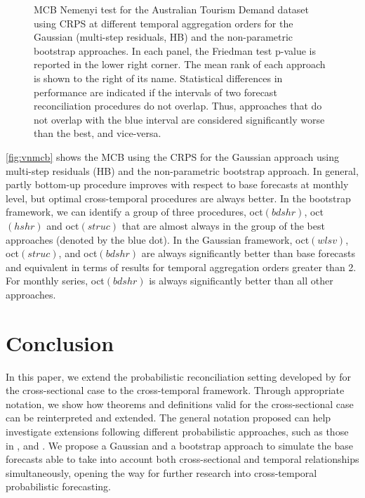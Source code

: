 \documentclass[12pt]{article}
\theoremstyle{definition}
\begin{document}
\begin{figure}[p]
	\caption{MCB Nemenyi test for the Australian Tourism Demand dataset using CRPS at different temporal aggregation orders for the Gaussian (multi-step residuals, HB) and the non-parametric bootstrap approaches. In each panel, the Friedman test p-value is reported in the lower right corner. The mean rank of each approach is shown to the right of its name. Statistical differences in performance are indicated if the intervals of two forecast reconciliation procedures do not overlap. Thus, approaches that do not overlap with the blue interval are considered significantly worse than the best, and vice-versa.}
	\label{fig:vnmcb}
\end{figure}

\autoref{fig:vnmcb} shows the MCB using the CRPS for the Gaussian approach using multi-step residuals (HB) and the non-parametric bootstrap approach. In general, partly bottom-up procedure improves with respect to base forecasts at monthly level, but optimal cross-temporal procedures are always better. In the bootstrap framework, we can identify a group of three procedures, oct$(bdshr)$, oct$(hshr)$ and oct$(struc)$ that are almost always in the group of the best approaches (denoted by the blue dot). In the Gaussian framework, oct$(wlsv)$, oct$(struc)$, and oct$(bdshr)$ are always significantly better than base forecasts and equivalent in terms of results for temporal aggregation orders greater than 2. For monthly series, oct$(bdshr)$ is always significantly better than all other approaches.

\section{Conclusion}\label{sec:conclusion}

In this paper, we extend the probabilistic reconciliation setting developed by \cite{panagiotelis2023} for the cross-sectional case to the cross-temporal framework. Through appropriate notation, we show how theorems and definitions valid for the cross-sectional case can be reinterpreted and extended. The general notation proposed can help investigate extensions following different probabilistic approaches, such as those in \cite{jeon2019}, \cite{bentaieb2021} and \cite{corani2022}. We propose a Gaussian and a bootstrap approach to simulate the base forecasts able to take into account both cross-sectional and temporal relationships simultaneously, opening the way for further research into  cross-temporal probabilistic forecasting.
\end{document}
